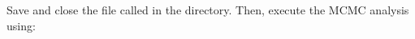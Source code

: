 {\begin{framed}
Save and close the file called {\textcolor{red}{}} in the  directory. 
Then, execute the MCMC analysis using: \colorbox{shadecolor}{}
\end{framed}}



%



